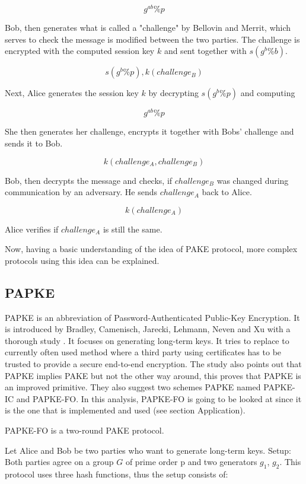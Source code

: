 \documentclass[../main.tex]{subfiles}
\begin{document}
\[g^{ab} \% p\]

Bob, then generates what is called a "challenge" by Bellovin and Merrit, which serves
to check the message is modified between the two parties. The challenge is encrypted
with the computed session key \(k\) and sent together with \(s(g^b \% b)\).

\[s(g^b \% p), k(challenge_B)\]

Next, Alice generates the session key \(k\) by decrypting \(s(g^b \% p)\) and computing

\[g^{ab} \% p\]

She then generates her challenge, encrypts it together with Bobs' challenge
and sends it to Bob. 

\[k(challenge_A, challenge_B)\]

Bob, then decrypts the message and checks, if \(challenge_B\) was changed during
communication by an adversary. He sends \(challenge_A\) back to Alice.

\[k(challenge_A)\]

Alice verifies if \(challenge_A\) is still the same.

Now, having a basic understanding of  the idea of PAKE protocol, more complex protocols
using this idea can be explained.

\subsection{PAPKE}
PAPKE is an abbreviation of Password-Authenticated Public-Key Encryption. It is
introduced by Bradley, Camenisch, Jarecki, Lehmann, Neven and Xu with a thorough
study \cite{bradley2019password}. It focuses on generating long-term keys. It
tries to replace to currently often used method where a third party using
certificates has to be trusted to provide a secure end-to-end encryption. The
study also points out that PAPKE implies PAKE but not the other way around,
this proves that PAPKE is an improved primitive. They also suggest two schemes
PAPKE named PAPKE-IC and PAPKE-FO. In this analysis, PAPKE-FO is going to be
looked at since it is the one that is implemented and used (see section
Application).

PAPKE-FO is a two-round PAKE protocol.

Let Alice and Bob be two parties who want to generate long-term keys.
Setup: Both parties agree on a group \(G\) of prime order p and two generators
\(g_1\), \(g_2\). This protocol uses three hash functions, thus the setup
consists of: 
\end{document}
